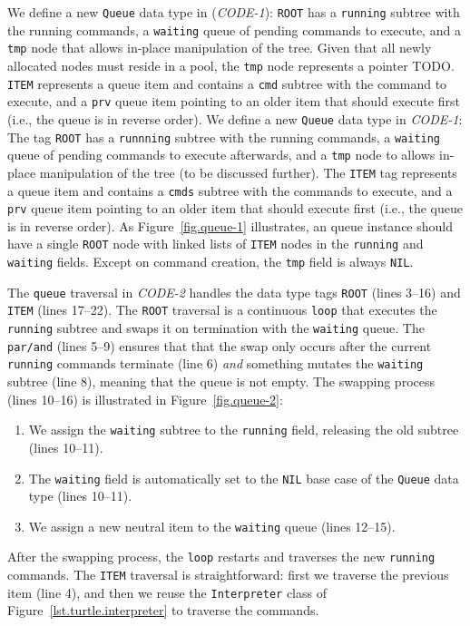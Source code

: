 \documentclass{acm_proc_article-sp}
\newcommand{\code}[1] {{\small{\texttt{#1}}}}
\begin{document}
We define a new \code{Queue} data type in (\emph{CODE-1}):
\code{ROOT} has a \code{running} subtree with the running commands, a 
\code{waiting} queue of pending commands to execute, and a \code{tmp} node that 
allows in-place manipulation of the tree.
Given that all newly allocated nodes must reside in a pool, the \code{tmp} node 
represents a pointer TODO.
\code{ITEM} represents a queue item and contains a \code{cmd} subtree with the 
command to execute, and a \code{prv} queue item pointing to an older item that 
should execute first (i.e., the queue is in reverse order).
%
We define a new \code{Queue} data type in \emph{CODE-1}:
The tag \code{ROOT} has a \code{runnning} subtree with the running commands, a 
\code{waiting} queue of pending commands to execute afterwards, and a 
\code{tmp} node to allows in-place manipulation of the tree (to be discussed 
further).
%
The \code{ITEM} tag represents a queue item and contains a \code{cmds} subtree 
with the commands to execute, and a \code{prv} queue item pointing to an older 
item that should execute first (i.e., the queue is in reverse order).
%
As Figure~\ref{fig.queue-1} illustrates, an queue instance should have a single 
\code{ROOT} node with linked lists of \code{ITEM} nodes in the \code{running} 
and \code{waiting} fields.
Except on command creation, the \code{tmp} field is always \code{NIL}.

The \code{queue} traversal in \emph{CODE-2} handles the data type tags 
\code{ROOT} (lines 3--16) and \code{ITEM} (lines 17--22).
%
The \code{ROOT} traversal is a continuous \code{loop} that executes the 
\code{running} subtree and swaps it on termination with the \code{waiting} 
queue.
The \code{par/and} (lines 5--9) ensures that that the swap only occurs after 
the current \code{running} commands terminate (line 6) \emph{and} something 
mutates the \code{waiting} subtree (line 8), meaning that the queue is not 
empty.
The swapping process (lines 10--16) is illustrated in Figure~\ref{fig.queue-2}:
%
\begin{enumerate}
\item We assign the \code{waiting} subtree to the \code{running} field, 
releasing the old subtree (lines 10--11).
\item The \code{waiting} field is automatically set to the \code{NIL} base case 
of the \code{Queue} data type (lines 10--11).
\item We assign a new neutral item to the \code{waiting} queue (lines 12--15).
\end{enumerate}
%
After the swapping process, the \code{loop} restarts and traverses the new 
\code{running} commands.
%
The \code{ITEM} traversal is straightforward:
first we traverse the previous item (line 4), and then we reuse the 
\code{Interpreter} class of Figure~\ref{lst.turtle.interpreter} to traverse the 
commands.
\end{document}
